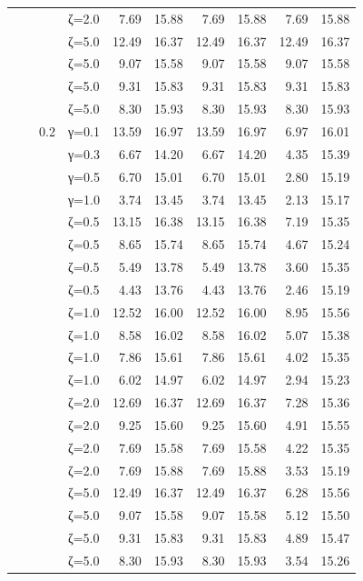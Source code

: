 \begin{table}[htbp]
\begin{tabular}{ll r l  rr  rr  rr}
  &  &  & ζ=2.0 & 7.69 & 15.88 & 7.69 & 15.88 & 7.69 & 15.88 \\
  &  &  & ζ=5.0 & 12.49 & 16.37 & 12.49 & 16.37 & 12.49 & 16.37 \\
  &  &  & ζ=5.0 & 9.07 & 15.58 & 9.07 & 15.58 & 9.07 & 15.58 \\
  &  &  & ζ=5.0 & 9.31 & 15.83 & 9.31 & 15.83 & 9.31 & 15.83 \\
  &  &  & ζ=5.0 & 8.30 & 15.93 & 8.30 & 15.93 & 8.30 & 15.93 \\
  &  & 0.2 & γ=0.1 & 13.59 & 16.97 & 13.59 & 16.97 & 6.97 & 16.01 \\
  &  &  & γ=0.3 & 6.67 & 14.20 & 6.67 & 14.20 & 4.35 & 15.39 \\
  &  &  & γ=0.5 & 6.70 & 15.01 & 6.70 & 15.01 & 2.80 & 15.19 \\
  &  &  & γ=1.0 & 3.74 & 13.45 & 3.74 & 13.45 & 2.13 & 15.17 \\
  &  &  & ζ=0.5 & 13.15 & 16.38 & 13.15 & 16.38 & 7.19 & 15.35 \\
  &  &  & ζ=0.5 & 8.65 & 15.74 & 8.65 & 15.74 & 4.67 & 15.24 \\
  &  &  & ζ=0.5 & 5.49 & 13.78 & 5.49 & 13.78 & 3.60 & 15.35 \\
  &  &  & ζ=0.5 & 4.43 & 13.76 & 4.43 & 13.76 & 2.46 & 15.19 \\
  &  &  & ζ=1.0 & 12.52 & 16.00 & 12.52 & 16.00 & 8.95 & 15.56 \\
  &  &  & ζ=1.0 & 8.58 & 16.02 & 8.58 & 16.02 & 5.07 & 15.38 \\
  &  &  & ζ=1.0 & 7.86 & 15.61 & 7.86 & 15.61 & 4.02 & 15.35 \\
  &  &  & ζ=1.0 & 6.02 & 14.97 & 6.02 & 14.97 & 2.94 & 15.23 \\
  &  &  & ζ=2.0 & 12.69 & 16.37 & 12.69 & 16.37 & 7.28 & 15.36 \\
  &  &  & ζ=2.0 & 9.25 & 15.60 & 9.25 & 15.60 & 4.91 & 15.55 \\
  &  &  & ζ=2.0 & 7.69 & 15.58 & 7.69 & 15.58 & 4.22 & 15.35 \\
  &  &  & ζ=2.0 & 7.69 & 15.88 & 7.69 & 15.88 & 3.53 & 15.19 \\
  &  &  & ζ=5.0 & 12.49 & 16.37 & 12.49 & 16.37 & 6.28 & 15.56 \\
  &  &  & ζ=5.0 & 9.07 & 15.58 & 9.07 & 15.58 & 5.12 & 15.50 \\
  &  &  & ζ=5.0 & 9.31 & 15.83 & 9.31 & 15.83 & 4.89 & 15.47 \\
  &  &  & ζ=5.0 & 8.30 & 15.93 & 8.30 & 15.93 & 3.54 & 15.26 \\

\end{tabular}
\end{table}
